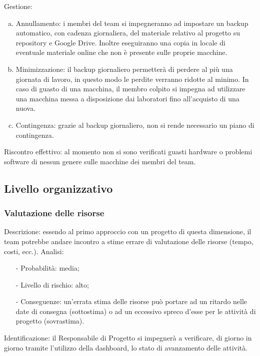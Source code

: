 \documentclass[../analisi_dei_rischi.tex]{subfiles}
\begin{document}
	Gestione:
	\begin{enumerate}[(a)]
		\item Annullamento: i membri del team si impegneranno ad impostare un backup automatico, con cadenza giornaliera, del materiale relativo al progetto su 	repository e Google Drive. Inoltre eseguiranno una copia in locale di eventuale materiale online che non è presente sulle proprie macchine.
		\item Minimizzazione: il backup giornaliero permetterà di perdere al più una giornata di lavoro, in questo modo le perdite verranno ridotte al minimo. In caso di guasto di una macchina, il membro colpito si impegna ad utilizzare una macchina messa a disposizione dai laboratori fino all’acquisto di una nuova. 
		\item Contingenza: grazie al backup giornaliero, non si rende necessario un piano di contingenza.
	\end{enumerate} 	
	Riscontro effettivo: al momento non si sono verificati guasti hardware o problemi software di nessun genere sulle macchine dei membri del team.

\subsection{Livello organizzativo}

\subsubsection{Valutazione delle risorse}
	Descrizione: essendo al primo approccio con un progetto di questa dimensione, il team potrebbe andare incontro a stime errare di valutazione delle risorse (tempo, costi, ecc.).
	Analisi:
	\begin{itemize}
		\item[-] Probabilità: media;
		\item[-] Livello di rischio: alto;
		\item[-] Conseguenze: un’errata stima delle risorse può portare ad un ritardo nelle date di consegna (sottostima) o ad un eccessivo spreco d’esse per le attività di progetto (sovrastima).
	\end{itemize}
	Identificazione: il Responsabile di Progetto si impegnerà a verificare, di giorno in giorno tramite l’utilizzo della dashboard, lo stato di avanzamento delle attività.
	
\end{document}
